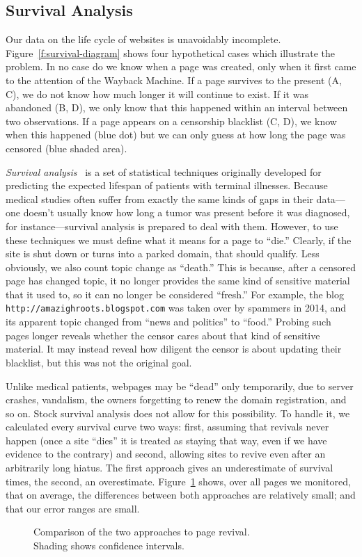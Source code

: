 \subsection{Survival Analysis}\label{s:survival-desc}



Our data on the life cycle of websites is unavoidably incomplete.
Figure~\ref{f:survival-diagram} shows four hypothetical cases which
illustrate the problem.  In no case do we know when a page was
created, only when it first came to the attention of the Wayback
Machine.  If a page survives to the present (A, C), we do not know how
much longer it will continue to exist.  If it was abandoned (B, D), we
only know that this happened within an interval between two
observations.  If a page appears on a censorship blacklist (C, D), we
know when this happened (blue dot) but we can only guess at how long
the page was censored (blue shaded area).

\emph{Survival analysis}~\cite{KM58} is a set of statistical
techniques originally developed for predicting the expected lifespan
of patients with terminal illnesses.  Because medical studies often
suffer from exactly the same kinds of gaps in their data---one doesn't
usually know how long a tumor was present before it was diagnosed, for
instance---survival analysis is prepared to deal with them.  However,
to use these techniques we must define what it means for a page to
“die.”  Clearly, if the site is shut down or turns into a parked
domain, that should qualify.  Less obviously, we also count topic
change as “death.”  This is because, after a censored page has changed
topic, it no longer provides the same kind of sensitive material that
it used to, so it can no longer be considered “fresh.”  For example,
the blog \nolinkurl{http://amazighroots.blogspot.com} was taken over
by spammers in 2014, and its apparent topic changed from “news and
politics” to “food.”  Probing such pages longer reveals whether the
censor cares about that kind of sensitive material.  It may instead
reveal how diligent the censor is about updating their blacklist, but
this was not the original goal.

Unlike medical patients, webpages may be “dead” only temporarily, due
to server crashes, vandalism, the owners forgetting to renew the
domain registration, and so on.  Stock survival analysis does not
allow for this possibility.  To handle it, we calculated every
survival curve two ways: first, assuming that revivals never happen
(once a site “dies” it is treated as staying that way, even if we have
evidence to the contrary) and second, allowing sites to revive even
after an arbitrarily long hiatus.  The first approach gives an
underestimate of survival times, the second, an overestimate.
Figure~\ref{fig:km-base} shows, over all pages we monitored, that on
average, the differences between both approaches are relatively small;
and that our error ranges are small.

\begin{figure}
\centering\sffamily\relax
\caption{Comparison of the two approaches to page revival.\\
Shading shows confidence intervals.}
\label{fig:km-base}
\end{figure}
